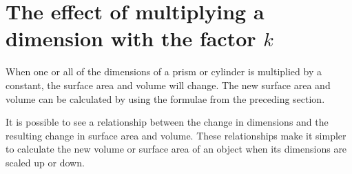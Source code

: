 \section[The effect of multiplying a dimension with the factor $k$]{\Huge The effect of multiplying a dimension with the factor $k$}
When one or all of the dimensions of a prism or cylinder is multiplied by a constant, the
surface area and volume will change. The new surface area and volume can be calculated by
using the formulae from the preceding section.\par
It is possible to see a relationship between the change in dimensions and the resulting change
in surface area and volume. These relationships make it simpler to
calculate the new volume or surface area of an object when its dimensions are
scaled up or down.\par

